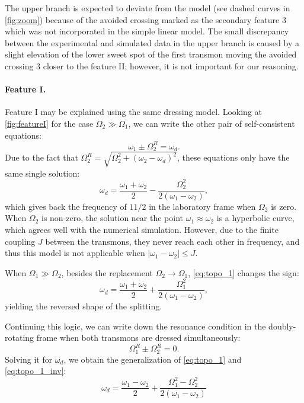 \documentclass[%
 pra,
 amsmath,amssymb,
 reprint,%
]{revtex4-1}
\begin{document}
The upper branch is expected to deviate from the model (see dashed curves in \autoref{fig:zoom}) because of the avoided crossing marked as the secondary feature 3 which was not incorporated in the simple linear model. The small discrepancy between the experimental and simulated data in the upper branch is caused by a slight elevation of the lower sweet spot of the first transmon moving the avoided crossing 3 closer to the feature II; however, it is not important for our reasoning.	


\paragraph{Feature I.} Feature I may be explained using the same dressing model. Looking at \autoref{fig:featureI} for the case $\Omega_2 \gg \Omega_1$, we can write the other pair of self-consistent equations:
\begin{equation}
\omega_{1} \pm \Omega_2^R = \omega_d.
\end{equation}
Due to the fact that $\Omega_2^R = \sqrt{\Omega_2^2 + (\omega_2 - \omega_d)^2}$, these equations only have the same single solution:
\begin{equation}
\omega_d = \frac{\omega_1 + \omega_2}{2} - \frac{ \Omega_{2}^{2}}{2 \left(\omega_{1} - \omega_{2}\right)},
\label{eq:topo_1}
\end{equation}
which gives back the frequency of $11/2$ in the laboratory frame when $\Omega_2$ is zero. When $\Omega_2$ is non-zero, the solution near the point $\omega_1 \approx \omega_2$ is a hyperbolic curve, which agrees well with the numerical simulation. However, due to the finite coupling $J$ between the transmons, they never reach each other in frequency, and thus this model is not applicable when $|\omega_1 - \omega_2| \leq J$.

When $\Omega_1 \gg \Omega_2$, besides the 
replacement $\Omega_2 \rightarrow \Omega_1$, 
\autoref{eq:topo_1} changes the sign:
\begin{equation}
\omega_d = \frac{\omega_1 + \omega_2}{2} + \frac{ \Omega_{1}^{2}}{2 \left(\omega_{1} - \omega_{2}\right)},
\label{eq:topo_1_inv}
\end{equation}
yielding the reversed shape of the splitting.

Continuing this logic, we can write down the resonance condition in the doubly-rotating frame when both transmons are dressed simultaneously:
\begin{equation}
\Omega_1^R \pm \Omega_2^R = 0.
\label{eq:zero-photon}
\end{equation}
Solving it for $\omega_d$, we obtain the 
generalization of \autoref{eq:topo_1} and 
\autoref{eq:topo_1_inv}:
\begin{equation}
\omega_d = \frac{\omega_{1} - \omega_{2}}{2} + \frac{\Omega_{1}^{2} - \Omega_{2}^{2}}{ 2\left(\omega_{1} - \omega_{2}\right)}
\label{eq:topo_comm}
\end{equation}
\end{document}
